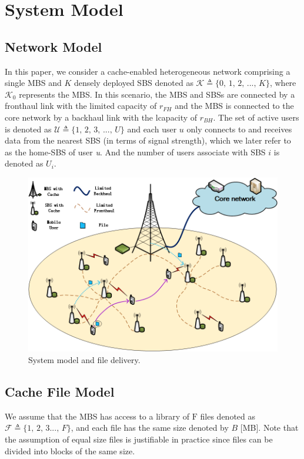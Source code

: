 \documentclass[conference]{IEEEtran}
\begin{document}
\section{System Model}
\subsection{Network Model}
In this paper, we consider a cache-enabled heterogeneous network comprising a single MBS and $K$ densely deployed SBS denoted as $\mathcal{K} \triangleq\{0\mathrm{,\,}1\mathrm{,\,}2\mathrm{,\,}...\mathrm{,\,}K\}$, where $\mathcal{K}_0$ represents the MBS. In this scenario, the MBS and SBSs are connected by a fronthaul link with the limited capacity of $r_{FH}$ and the MBS is connected to the core network by a backhaul link with the lcapacity of $ r_{BH}$. The set of active users is denoted as $\mathcal{U} \triangleq\{1\mathrm{,\,}2\mathrm{,\,}3\mathrm{,\,}...\mathrm{,\,}U\}$ and each user $u$ only connects to and receives data from the nearest SBS (in terms of signal strength), which we later refer to as the  home-SBS of user \emph{u}. And the number of users associate with SBS $i$ is denoted as $U_i$.

\begin{figure}[htbp]
 \centerline{\includegraphics[scale=0.5]{fig1.png}}
 \caption{System model and file delivery.}
 \label{fig 1}
\end{figure}

\subsection{Cache File Model}
We assume that the MBS has access to a library of $\mathrm{F}$ files denoted as $\mathcal{F} \triangleq\{1\mathrm{,\,}2\mathrm{,\,}3...\mathrm{,\,}F\}$, and each file has the same size denoted by $B$ [MB]. Note that the assumption of equal size files is justifiable in practice since files can be divided into blocks of the same size.
\end{document}

